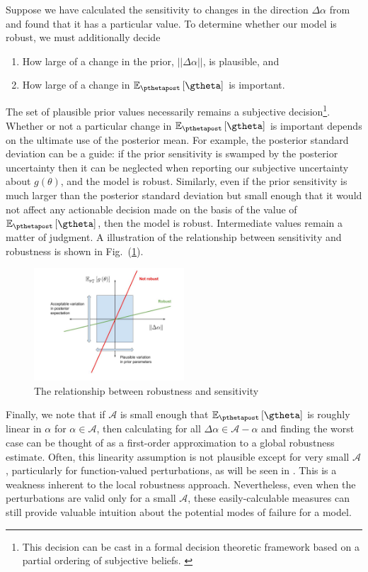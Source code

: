 \documentclass{article}\usepackage[]{graphicx}\usepackage[]{color}
\theoremstyle{plain}
\theoremstyle{definition}
\theoremstyle{plain}
\theoremstyle{plain}
\theoremstyle{plain}
\theoremstyle{plain}
\newcommand{\fig}[1]{Fig.~(\ref{fig:#1})}
\begin{document}
Suppose we have calculated the sensitivity to changes in the direction
$\Delta\alpha$ from  and found that
it has a particular value. To determine whether our model is robust,
we must additionally decide 
\begin{enumerate}
\item How large of a change in the prior, $||\Delta\alpha||$, is plausible,
and 
\item How large of a change in $\epgtheta$ is important.
\end{enumerate}
The set of plausible prior values necessarily remains a subjective
decision\footnote{This decision can be cast in a formal decision theoretic framework
based on a partial ordering of subjective beliefs. \citep{insua:2012:robustaxioms}}. Whether or not a particular change in $\epgtheta$ is important
depends on the ultimate use of the posterior mean. For example, the
posterior standard deviation can be a guide: if the prior sensitivity
is swamped by the posterior uncertainty then it can be neglected when
reporting our subjective uncertainty about $g\left(\theta\right)$,
and the model is robust. Similarly, even if the prior sensitivity
is much larger than the posterior standard deviation but small enough
that it would not affect any actionable decision made on the basis
of the value of $\epgtheta$, then the model is robust. Intermediate
values remain a matter of judgment. A illustration of the relationship
between sensitivity and robustness is shown in \fig{robustness_vs_sensitivity}.

\begin{figure}
\centering{}\includegraphics[width=0.5\textwidth]{2_home_rgiordan_Documents_git_repos_Covariances___Paper_writing_static_images_sensitivity_use.jpg}
\caption{The relationship between robustness and sensitivity\label{fig:robustness_vs_sensitivity} }
\end{figure}

Finally, we note that if $\mathcal{A}$ is small enough that $\epgtheta$
is roughly linear in $\alpha$ for $\alpha\in\mathcal{A}$, then calculating
 for all $\Delta\alpha\in\mathcal{A}-\alpha$
and finding the worst case can be thought of as a first-order approximation
to a global robustness estimate. Often, this linearity assumption
is not plausible except for very small $\mathcal{A}$, particularly
for function-valued perturbations, as will be seen in .
This is a weakness inherent to the local robustness approach. Nevertheless,
even when the perturbations are valid only for a small $\mathcal{A}$,
these easily-calculable measures can still provide valuable intuition
about the potential modes of failure for a model.
\end{document}
